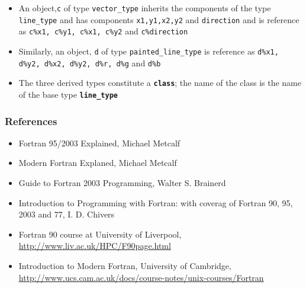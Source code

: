 \documentclass[slidestop,mathserif,compress,xcolor=svgnames]{beamer}
\newcommand{\bftt}[1]{\textbf{\texttt{#1}}}
\newenvironment{bblock}[0]
{
\begin{beamerboxesrounded}[upper=uppercol1,lower=lowercol1,shadow=true]}
{\end{beamerboxesrounded}}
\begin{document}
\begin{frame}[allowframebreaks]
\begin{itemize}
\begin{columns}
\begin{bblock}{}
      \end{bblock}
    \end{columns}
    \item An object,\texttt{c} of type \texttt{vector\_type} inherits the components of the type \texttt{line\_type} and has components \texttt{x1,y1,x2,y2} and \texttt{direction} and is reference as \texttt{c\%x1, c\%y1, c\%x1, c\%y2} and \texttt{c\%direction} 
    \item Similarly, an object, \texttt{d} of type \texttt{painted\_line\_type} is reference as \texttt{d\%x1, d\%y2, d\%x2, d\%y2, d\%r, d\%g} and \texttt{d\%b}
    \item The three derived types constitute a \bftt{class}; the name of the class is the name of the base type \bftt{line\_type}
  \end{itemize}
\end{frame}

\begin{frame}
  \frametitle{\small References}
  \begin{itemize}
    \item Fortran 95/2003 Explained, Michael Metcalf
    \item Modern Fortran Explaned, Michael Metcalf
    \item Guide to Fortran 2003 Programming, Walter S. Brainerd
    \item Introduction to Programming with Fortran: with coverag of Fortran 90, 95, 2003 and 77, I. D. Chivers
    \item Fortran 90 course at University of Liverpool, \url{http://www.liv.ac.uk/HPC/F90page.html}
    \item Introduction to Modern Fortran, University of Cambridge, \url{http://www.ucs.cam.ac.uk/docs/course-notes/unix-courses/Fortran}
  \end{itemize}
\end{frame}
\end{document}
